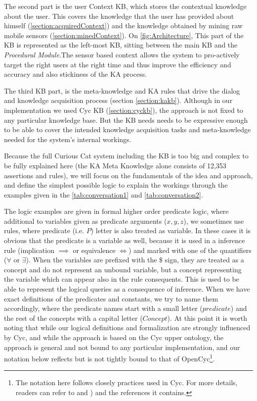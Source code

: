 The second part is the user Context KB, which stores the contextual knowledge 
about the user. This covers the knowledge that the user has provided about 
himself (\autoref{section:acquiredContext}) and the knowledge obtained by 
mining raw mobile sensors (\autoref{section:minedContext}). On 
\autoref{fig:Architecture}, This part of the KB is represented 
as the left-most KB, sitting between the main KB and the 
\emph{Procedural Module}.The sensor based context allows the system to 
pro-actively target the right users at the right time and thus improve the 
efficiency and accuracy and also stickiness of the KA process.

The third KB part, is the meta-knowledge and KA rules that drive the dialog and 
knowledge acquisition process (section \ref{section:kakb}). Although in our 
implementation we 
used Cyc KB (\autoref{section:cyckb}), the approach is not 
fixed to any particular knowledge base. But the KB needs needs to be expressive
enough to be able to cover the intended knowledge acquisition tasks and 
meta-knowledge needed for the system's internal workings. 

Because the full Curious Cat system including the KB is too big and complex to 
be fully explained here (the KA Meta Knowledge alone consists of 12,353 
assertions and rules), we will focus on the fundamentals of the idea and 
approach, and define the simplest possible logic to explain the workings 
through the examples given in the \autoref{tab:conversation1} and 
\autoref{tab:conversation2}. 

The logic examples are given in formal higher order predicate logic, where
additional to variables given as predicate arguments ($x, y, z$), we sometimes
use rules, where predicate (i.e. $P$) letter is also treated as variable. 
In these cases it is
obvious that the predicate is a variable as well, because it is used in a
inference rule (implication $\implies$ or equivalence $\iff$) and marked with
one of the quantifiers ($\forall$ or $\exists$). When the variables are
prefixed with the $\$$ sign, they are treated as a concept and do not
represent an unbound variable, but a concept representing the variable which
can appear also in the rule consequents. This is used to be able to represent
the logical queries as a consequence of inference.
When we have exact definitions of the predicates and constants, we try to name
them accordingly, where the predicate names start with a small letter 
($predicate$) and the rest of the 
concepts with a capital letter ($Concept$). At this point it is worth noting 
that while our logical definitions and formalization are strongly influenced by 
Cyc\parencite{Lenat1995}, and while the approach is based on the Cyc upper 
ontology, the approach is general and not bound to any particular 
implementation, and our notation below reflects but is not tightly bound to 
that of OpenCyc\footnote{The notation here follows closely practices used in 
Cyc. For more details, readers can refer to \parencite{Lenat1995} and
\parencite{Matuszek2006}) and the references it contains.}. 


